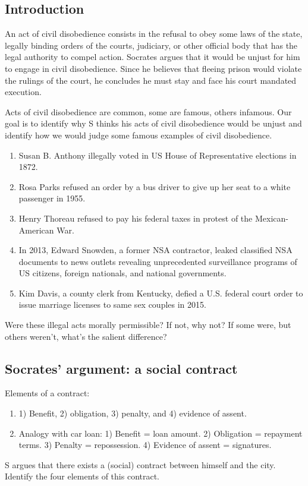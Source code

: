 \documentclass[oneside]{article}
\begin{document}
\subsection*{Introduction}

An act of civil disobedience consists in the refusal to obey some laws of the state, legally binding orders of the courts, judiciary, or other official body that has the  legal authority to compel action. Socrates argues that it would be unjust for him to engage in civil disobedience. Since he believes that fleeing prison would violate the rulings of the court, he concludes he must stay and face his court mandated execution.

Acts of civil disobedience are common, some are famous, others infamous. Our goal is to identify why S thinks his acts of civil disobedience would be unjust and identify how we would judge some famous examples of civil disobedience. 

\begin{enumerate}
\item Susan B. Anthony illegally voted in US House of Representative elections in 1872. 
\item Rosa Parks refused an order by a bus driver to give up her seat to a white passenger in 1955.
  \item Henry Thoreau refused to pay his federal taxes in protest of the Mexican-American War.
\item   In 2013, Edward Snowden, a former NSA contractor, leaked classified NSA documents to news outlets revealing unprecedented surveillance programs of US citizens, foreign nationals, and national governments.
\item Kim Davis, a county clerk from Kentucky, defied a U.S. federal court order to issue marriage licenses to same sex couples in 2015. 

\end{enumerate}
Were these illegal acts morally permissible? If not, why not? If some
 were, but others weren't, what's the salient difference?


\subsection*{Socrates' argument: a social contract}

Elements of a contract:

\begin{enumerate}
\item[ ] 1) Benefit, 2) obligation, 3) penalty, and 4) evidence of assent.
\item[ ]  Analogy with car loan:  1) Benefit = loan amount. 2) Obligation = repayment terms. 3) Penalty = repossession. 4) Evidence of assent = signatures.\end{enumerate}
S argues that there exists a (social) contract between himself and the city. Identify the four elements of this contract.
\end{document}
